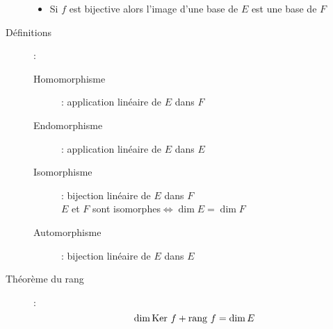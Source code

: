 \begin{description}
\begin{itemize}
    \item Si $f$ est bijective alors l'image d'une base de $E$ est une base de $F$
\end{itemize}
\item[Définitions] :
\begin{description}
    \item[Homomorphisme] : application linéaire de $E$ dans $F$
    \item[Endomorphisme] : application linéaire de $E$ dans $E$
    \item[Isomorphisme] : bijection linéaire de $E$ dans $F$\\
        $E$ et $F$ sont isomorphes$\Leftrightarrow\dim E=\dim F$
    \item[Automorphisme] : bijection linéaire de $E$ dans $E$
\end{description}
\item[Théorème du rang] :
    \[ \dim\textrm{Ker } f+\textrm{rang } f=\dim E \]
\end{description}
